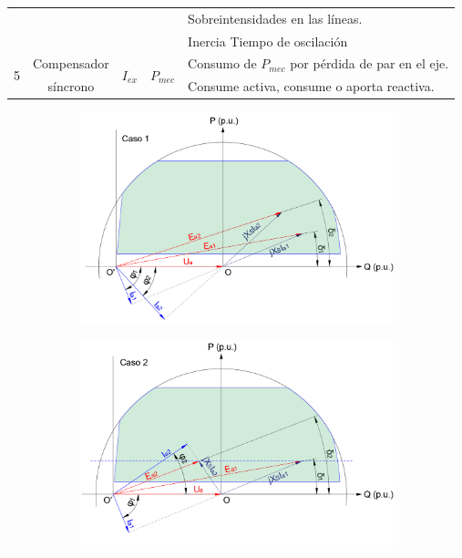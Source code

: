 \begin{table}[H]
\begin{tabular}{ccccl}
				&              &           &   & Sobreintensidades en las líneas. \\
				&              &           &            & \textuparrow Inercia \textrightarrow \textuparrow Tiempo de oscilación\\\hline
				\multirow{2}{*}{5} & Compensador  & \multirow{2}{*}{$I_{ex}$}  & \multirow{2}{*}{$P_{mec}$}  & Consumo de $P_{mec}$ por pérdida de par en el eje. \\
				& síncrono     & 			 & 			  & Consume activa, consume o aporta reactiva.\\\hline
			\end{tabular}
			\label{tab:modosFunc}
		\end{table}
		
		\begin{figure}[H]
			\begin{minipage}{0.5\textwidth}
				\begin{figure}[H]
					\centering
					\includegraphics[width=1\linewidth]{res/tema6/modoFunc1}
					\label{fig:modofunc1}
				\end{figure}
			\end{minipage}
			\begin{minipage}{0.5\textwidth}
				\begin{figure}[H]
					\centering
					\includegraphics[width=1\linewidth]{res/tema6/modoFunc2}
					\label{fig:modofunc2}
				\end{figure}
			\end{minipage}
		\end{figure}
		
